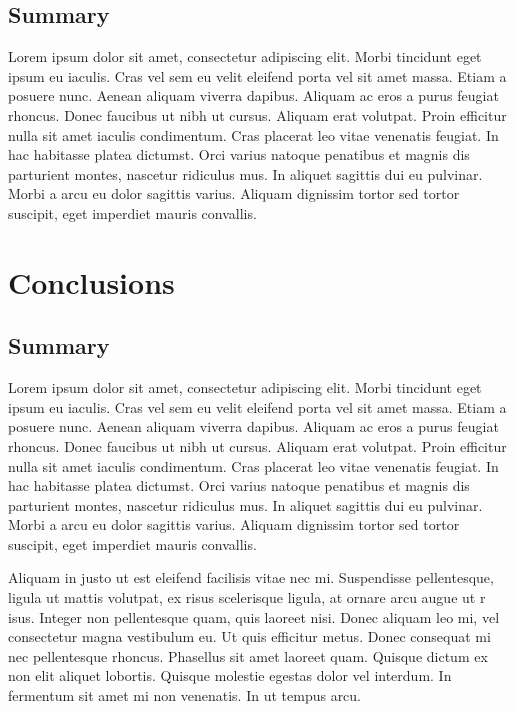 \documentclass[openany]{book}
\begin{document}
\section{Summary}
Lorem ipsum dolor sit amet, consectetur adipiscing elit. Morbi tincidunt eget 
ipsum eu iaculis. Cras vel sem eu velit eleifend porta vel sit amet massa. Etiam 
a posuere nunc. Aenean aliquam viverra dapibus. Aliquam ac eros a purus feugiat 
rhoncus. Donec faucibus ut nibh ut cursus. Aliquam erat volutpat. Proin efficitur 
nulla sit amet iaculis condimentum. Cras placerat leo vitae venenatis feugiat. In 
hac habitasse platea dictumst. Orci varius natoque penatibus et magnis dis 
parturient montes, nascetur ridiculus mus. In aliquet sagittis dui eu pulvinar. 
Morbi a arcu eu dolor sagittis varius. Aliquam dignissim tortor sed tortor 
suscipit, eget imperdiet mauris convallis.



\chapter{Conclusions}
\section{Summary}
Lorem ipsum dolor sit amet, consectetur adipiscing elit. Morbi tincidunt eget 
ipsum eu iaculis. Cras vel sem eu velit eleifend porta vel sit amet massa. Etiam 
a posuere nunc. Aenean aliquam viverra dapibus. Aliquam ac eros a purus feugiat 
rhoncus. Donec faucibus ut nibh ut cursus. Aliquam erat volutpat. Proin efficitur 
nulla sit amet iaculis condimentum. Cras placerat leo vitae venenatis feugiat. In 
hac habitasse platea dictumst. Orci varius natoque penatibus et magnis dis 
parturient montes, nascetur ridiculus mus. In aliquet sagittis dui eu pulvinar. 
Morbi a arcu eu dolor sagittis varius. Aliquam dignissim tortor sed tortor 
suscipit, eget imperdiet mauris convallis.

Aliquam in justo ut est eleifend facilisis vitae nec mi. Suspendisse pellentesque, 
ligula ut mattis volutpat, ex risus scelerisque ligula, at ornare arcu augue ut r
isus. Integer non pellentesque quam, quis laoreet nisi. Donec aliquam leo mi, vel 
consectetur magna vestibulum eu. Ut quis efficitur metus. Donec consequat mi nec 
pellentesque rhoncus. Phasellus sit amet laoreet quam. Quisque dictum ex non elit 
aliquet lobortis. Quisque molestie egestas dolor vel interdum. In fermentum sit 
amet mi non venenatis. In ut tempus arcu.
\end{document}
